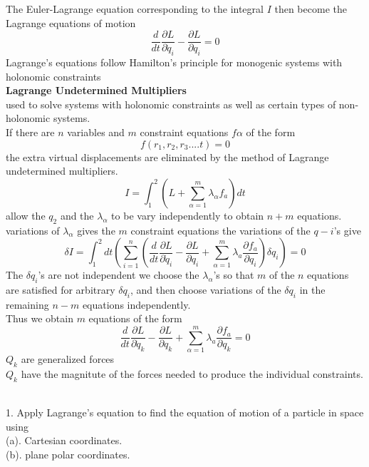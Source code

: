 The Euler-Lagrange equation corresponding to the integral $I$ then become the Lagrange equations of motion 
$$\frac{d}{d t} \frac{\partial L}{\partial \dot{q}_{i}}-\frac{\partial L}{\partial q_{i}}=0$$
Lagrange's equations follow Hamilton's principle for monogenic systems with holonomic constraints \\
\textbf{Lagrange Undetermined Multipliers}\\
used to solve systems with holonomic constraints as well as certain types of non-holonomic systems. \\
If there are $n$ variables and $m$ constraint equations $f\alpha$ of the form
$$f(r_1,r_2,r_3....t)=0$$
the extra virtual displacements are eliminated by the method of Lagrange undetermined multipliers.
$$I=\int_{1}^{2}\left(L+\sum_{\alpha=1}^{m} \lambda_{\alpha} f_{a}\right) d t$$
allow the $q_2$ and the $\lambda_\alpha$ to be vary independently to obtain $n+m$ equations.\\
variations of $\lambda_\alpha$ gives the $m$ constraint equations the variations of the $q-i$'s give
$$\delta I=\int_{1}^{2} d t\left(\sum_{i=1}^{n}\left(\frac{d}{d t} \frac{\partial L}{\partial \dot{q}_{i}}-\frac{\partial L}{\partial q_{i}}+\sum_{\alpha=1}^{m} \lambda_{a} \frac{\partial f_{a}}{\partial q_{i}}\right) \delta q_{i}\right)=0$$
The $\delta q_i$'s are not independent we choose the $\lambda_{\alpha}$'s so that $m$ of the $n$ equations are satisfied for arbitrary $\delta q_i$, and then choose variations of the $\delta q_i$ in the remaining $n-m$ equations independently.\\
Thus we obtain $m$ equations of the form
$$\frac{d}{d t} \frac{\partial L}{\partial \dot{q}_{k}}-\frac{\partial L}{\partial q_{k}}+\sum_{\alpha=1}^{m} \lambda_{a} \frac{\partial f_{a}}{\partial q_{k}}=0$$
$Q_k$ are generalized forces\\
$Q_k$ have the magnitute of the forces needed to produce the individual constraints.\\\\
\begin{exercise}
1. Apply Lagrange's equation to find the equation of motion of a particle in space using \\
(a). Cartesian coordinates. \\
(b). plane polar coordinates.
\end{exercise}

